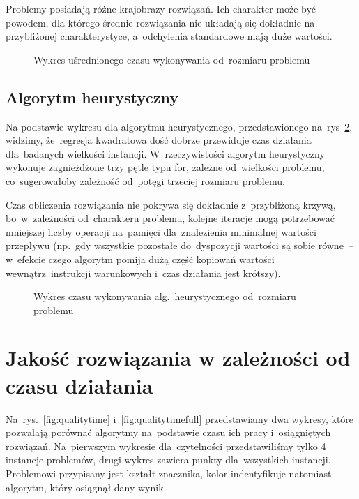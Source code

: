\documentclass[a4paper,10pt]{article}
\begin{document}
Problemy posiadają różne krajobrazy rozwiązań.
Ich charakter może być powodem, dla którego średnie rozwiązania nie układają się dokładnie na przybliżonej charakterystyce,
a~odchylenia standardowe mają duże wartości.

\begin{figure}[!htpb]
\begin{center}

\caption{Wykres uśrednionego czasu wykonywania od~rozmiaru problemu}
\label{fig:timesize}
\end{center}
\end{figure}

\subsection{Algorytm heurystyczny}
Na podstawie wykresu dla algorytmu heurystycznego, przedstawionego na~rys~\ref{fig:timesizeheuristic},
widzimy, że~regresja kwadratowa dość dobrze przewiduje czas działania dla~badanych wielkości instancji.
W~rzeczywistości algorytm heurystyczny wykonuje zagnieżdżone trzy pętle typu for, zależne od~wielkości problemu,
co~sugerowałoby zależność od~potęgi trzeciej rozmiaru problemu.

Czas obliczenia rozwiązania nie pokrywa się dokładnie z~przybliżoną krzywą, bo~w~zależności od~charakteru problemu,
kolejne iteracje mogą potrzebować mniejszej liczby operacji na~pamięci dla~znalezienia minimalnej wartości przepływu
(np.~gdy wszystkie pozostałe do~dyspozycji wartości są sobie równe~-- w~efekcie czego algorytm pomija dużą część kopiowań
wartości wewnątrz~instrukcji warunkowych i~czas działania jest krótszy).

\begin{figure}[!htpb]
\begin{center} 

\caption{Wykres czasu wykonywania alg.~heurystycznego od~rozmiaru problemu}
\label{fig:timesizeheuristic}
\end{center}
\end{figure}

%

\section{Jakość rozwiązania w zależności od czasu działania}
Na~rys.~\ref{fig:qualitytime} i~\ref{fig:qualitytimefull} przedstawiamy dwa wykresy,
które pozwalają porównać algorytmy na~podstawie czasu ich pracy i~osiągniętych rozwiązań.
Na~pierwszym wykresie dla~czytelności przedstawiliśmy tylko 4 instancje problemów, drugi wykres zawiera punkty dla~wszystkich instancji. 
Problemowi przypisany jest kształt znacznika, kolor indentyfikuje natomiast algorytm, który osiągnął dany wynik.
\end{document}
